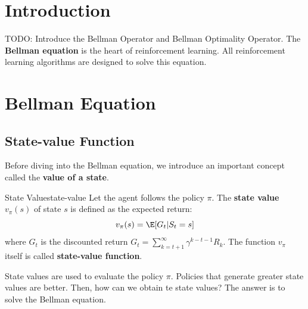 \section{Introduction}
TODO: Introduce the Bellman Operator and Bellman Optimality Operator.
The \textbf{Bellman equation} is the heart of reinforcement learning.
All reinforcement learning algorithms are designed to solve this equation.
\section{Bellman Equation}
    \subsection{State-value Function}
        Before diving into the Bellman equation, we introduce an important concept called the \textbf{value of a state}.
        \begin{defn}{State Value}{state-value}
            Let the agent follows the policy $\pi$. The \textbf{state value} $v_\pi(s)$ of state $s$ is defined as the expected return:
            \begin{equation}
                v_\pi(s) = \E[G_t|S_t=s] \label{eq:state-value}
            \end{equation}
            where $G_t$ is the discounted return $G_t=\sum_{k=t+1}^{\infty}\gamma^{k-t-1}R_{k}$.
            The function $v_\pi$ itself is called \textbf{state-value function}.
        \end{defn}
        State values are used to evaluate the policy $\pi$. Policies that generate greater state values are better. Then, how can we
        obtain te state values? The answer is to solve the Bellman equation.
